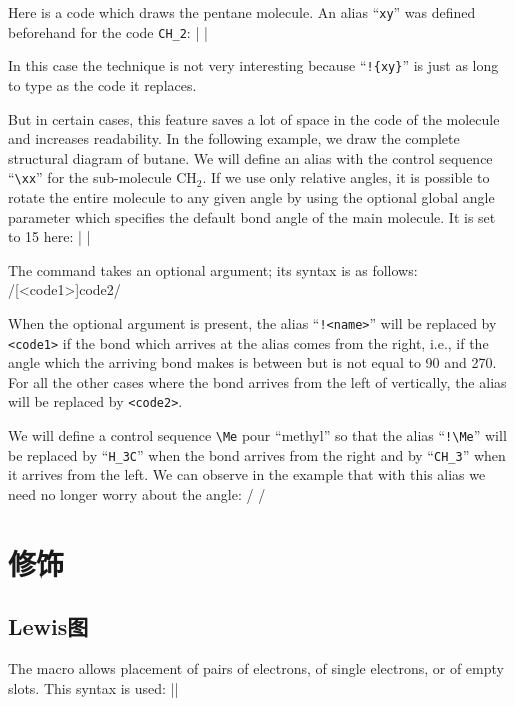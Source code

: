 \documentclass[10pt]{article}
\begin{document}
Here is a code which draws the pentane molecule. An alias ``\verb/xy/'' was defined beforehand for the code \verb/CH_2/:
|
	|

In this case the technique is not very interesting because ``\verb/!{xy}/'' is just as long to type as the code it replaces.

But in certain cases, this feature saves a lot of space in the code of the molecule and increases readability. In the following example, we draw the complete structural diagram of butane. We will define an alias with the control sequence ``\verb/\xx/'' for the sub-molecule $\mathrm{CH_2}$. If we use only relative angles, it is possible to rotate the entire molecule to any given angle by using the optional global angle parameter which specifies the default bond angle of the main molecule. It is set to 15\degres{} here:
|
|

The  command takes an optional argument; its syntax is as follows:
\centerverb/[<code1>]{code2}/
\medskip

When the optional argument is present, the alias ``\verb-!<name>-'' will be replaced by \verb'<code1>' if the bond which arrives at the alias comes from the right, i.e., if the angle which the arriving bond makes is between but is not equal to 90\degres{} and 270\degres{}. For all the other cases where the bond arrives from the left of vertically, the alias will be replaced by \verb-<code2>-.

We will define a control sequence \verb-\Me- pour ``methyl'' so that the alias ``\verb-!\Me-'' will be replaced by ``\verb-H_3C-'' when the bond arrives from the right and by ``\verb-CH_3-'' when it arrives from the left. We can observe in the example that with this alias we need no longer worry about the angle:
/
/

\section{修饰}
\subsection{Lewis图}\label{lewis}
The macro \idx{\lewis} allows placement of pairs of electrons, of single electrons, or of empty slots. This syntax is used:
\centerverb||
\smallskip
\end{document}
